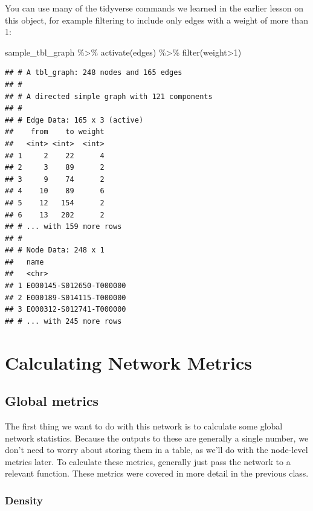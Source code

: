 \documentclass[
]{book}
\newenvironment{Shaded}{\begin{snugshade}}{\end{snugshade}}
\newcommand{\DecValTok}[1]{\textcolor[rgb]{0.00,0.00,0.81}{#1}}
\newcommand{\FunctionTok}[1]{\textcolor[rgb]{0.00,0.00,0.00}{#1}}
\newcommand{\NormalTok}[1]{#1}
\newcommand{\SpecialCharTok}[1]{\textcolor[rgb]{0.00,0.00,0.00}{#1}}
\begin{document}
You can use many of the tidyverse commands we learned in the earlier lesson on this object, for example filtering to include only edges with a weight of more than 1:

\begin{Shaded}
\begin{Highlighting}[]
\NormalTok{sample\_tbl\_graph }\SpecialCharTok{\%\textgreater{}\%} 
  \FunctionTok{activate}\NormalTok{(edges) }\SpecialCharTok{\%\textgreater{}\%}
  \FunctionTok{filter}\NormalTok{(weight}\SpecialCharTok{\textgreater{}}\DecValTok{1}\NormalTok{)}
\end{Highlighting}
\end{Shaded}

\begin{verbatim}
## # A tbl_graph: 248 nodes and 165 edges
## #
## # A directed simple graph with 121 components
## #
## # Edge Data: 165 x 3 (active)
##    from    to weight
##   <int> <int>  <int>
## 1     2    22      4
## 2     3    89      2
## 3     9    74      2
## 4    10    89      6
## 5    12   154      2
## 6    13   202      2
## # ... with 159 more rows
## #
## # Node Data: 248 x 1
##   name                   
##   <chr>                  
## 1 E000145-S012650-T000000
## 2 E000189-S014115-T000000
## 3 E000312-S012741-T000000
## # ... with 245 more rows
\end{verbatim}

\hypertarget{calculating-network-metrics}{%
\section{Calculating Network Metrics}\label{calculating-network-metrics}}

\hypertarget{global-metrics-1}{%
\subsection{Global metrics}\label{global-metrics-1}}

The first thing we want to do with this network is to calculate some global network statistics. Because the outputs to these are generally a single number, we don't need to worry about storing them in a table, as we'll do with the node-level metrics later. To calculate these metrics, generally just pass the network to a relevant function. These metrics were covered in more detail in the previous class.

\hypertarget{density-1}{%
\subsubsection{Density}\label{density-1}}
\end{document}
